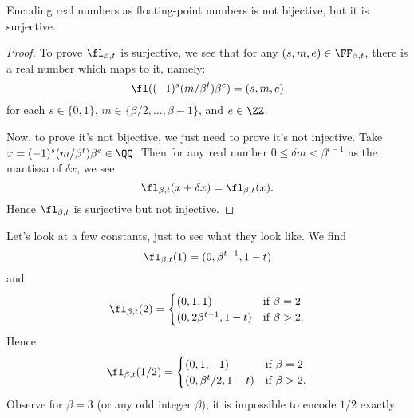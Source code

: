 \begin{thm}
Encoding real numbers as floating-point numbers is not bijective, but it
is surjective.
\end{thm}
\begin{proof}
To prove $\fl_{\beta,t}$ is surjective, we see that for any $(s,m,e)\in\FF_{\beta,t}$,
there is a real number which maps to it, namely:
\begin{equation}
  \fl((-1)^{s}(m/\beta^{t})\beta^{e}) = (s,m,e)
\end{equation}
for each $s\in\{0,1\}$, $m\in\{\beta/2,\dots,\beta-1\}$, and $e\in\ZZ$.

Now, to prove it's not bijective, we just need to prove it's not
injective. Take $x = (-1)^{s}(m/\beta^{t})\beta^{e}\in\QQ$. Then for
any real number $0\leq \delta m<\beta^{t-1}$ as the mantissa of $\delta x$,
we see
\begin{equation}
  \fl_{\beta,t}(x + \delta x) = \fl_{\beta,t}(x).
\end{equation}
Hence $\fl_{\beta,t}$ is surjective but not injective.
\end{proof}

\begin{ex}
  Let's look at a few constants, just to see what they look like. We find
  \begin{equation}
    \fl_{\beta,t}(1) = (0, \beta^{t-1}, 1-t)
  \end{equation}
  and
  \begin{equation}
    \fl_{\beta,t}(2) = \begin{cases}
      (0, 1, 1) & \mbox{if $\beta=2$}\\
      (0, 2\beta^{t-1}, 1-t)  & \mbox{if $\beta>2$}.
    \end{cases}
  \end{equation}
  Hence
  \begin{equation}
    \fl_{\beta,t}(1/2) = \begin{cases}
      (0, 1, -1) & \mbox{if $\beta=2$}\\
      (0, \beta^{t}/2, 1-t)  & \mbox{if $\beta>2$}.
    \end{cases}
  \end{equation}
  Observe for $\beta=3$ (or any odd integer $\beta$), it is impossible
  to encode $1/2$ exactly.
\end{ex}


